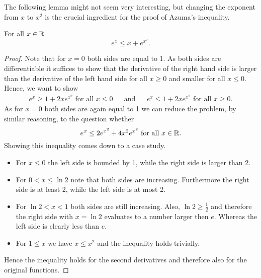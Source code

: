 		
		
The following lemma might not seem very interesting, but changing the exponent from $x$ to $x^2$ is the crucial ingredient for the proof of Azuma's inequality.
\begin{lemma}\label{lem:exToex2} For all $x\in\mathbb{R}$
	\[e^{x}\leq x+e^{x^2}.\]
\end{lemma} 
\begin{proof}
	Note that for $x=0$ both sides are equal to 1. As both sides are differentiable it suffices to show that the derivative of the right hand side is larger than the derivative of the left hand side for all $x\geq0$ and smaller for all $x\leq0$. Hence, we want to show
	\begin{align*}
		e^x\geq 1+2xe^{x^2}\text{ for all $x\leq 0$} &   & \text{and} &   & e^x\leq 1+2xe^{x^2}\text{ for all $x\geq 0$}. 
	\end{align*}
	As for $x=0$ both sides are again equal to 1 we can reduce the problem, by similar reasoning, to the question whether
	\[e^x\leq 2e^{x^2}+4x^2e^{x^2}\text{ for all $x\in\mathbb{R}$}.\]
	Showing this inequality comes down to a case study.
	\begin{itemize}
		\item For $x\leq0$ the left side is bounded by 1, while the right side is larger than 2.
		\item For $0<x\leq\ln 2$ note that both sides are increasing. Furthermore the right side is at least 2, while the left side is at most 2.
		\item For $\ln2<x<1$ both sides are still increasing. Also, $\ln2\geq\frac{1}{2}$ and therefore the right side with $x=\ln2$ evaluates to a number larger then $e$. Whereas the left side is clearly less than $e$.
		\item For $1\leq x$ we have $x\leq x^2$ and the inequality holds trivially.
	\end{itemize}
	Hence the inequality holds for the second derivatives  and therefore also for the original functions.
\end{proof}
		
